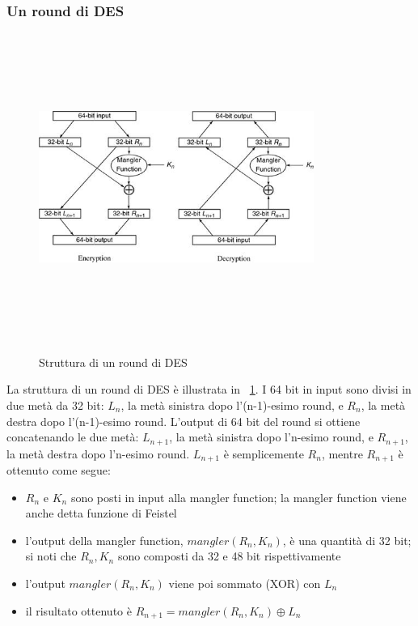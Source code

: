 \subsubsection{Un round di DES}
\begin{figure}[htbp]
	\centering%
	\subfigure%
	{\includegraphics[height=10cm, width=9cm, keepaspectratio]{Immagini/chiave_segreta/round_des.png}}
	\caption{Struttura di un round di DES \label{fig:round_des}} 	
\end{figure}
La struttura di un round di DES è illustrata in \figurename~\ref{fig:round_des}. I 64 bit in input sono divisi in due metà da 32 bit: $L_{n}$, la metà sinistra dopo l'(n-1)-esimo round, e $R_{n}$, la metà destra dopo l'(n-1)-esimo round. L'output di 64 bit del round si ottiene concatenando le due metà: $L_{n + 1}$, la metà sinistra dopo l'n-esimo round, e $R_{n + 1}$, la metà destra dopo l'n-esimo round. $L_{n+1}$ è semplicemente $R_{n}$, mentre $R_{n + 1}$ è ottenuto come segue:
\begin{itemize}
  \item $R_{n}$ e $K_{n}$ sono posti in input alla mangler function; la mangler function viene anche detta funzione di Feistel
  \item l'output della mangler function, $mangler(R_{n}, K_{n})$, è una quantità di 32 bit; si noti che $R_{n}, K_{n}$ sono composti da
32 e 48 bit rispettivamente
  \item l'output $mangler(R_{n}, K_{n})$ viene poi sommato (XOR) con $L_{n}$
  \item il risultato ottenuto è $R_{n+1} = mangler(R_{n}, K_{n}) \oplus L_{n}$
\end{itemize}

